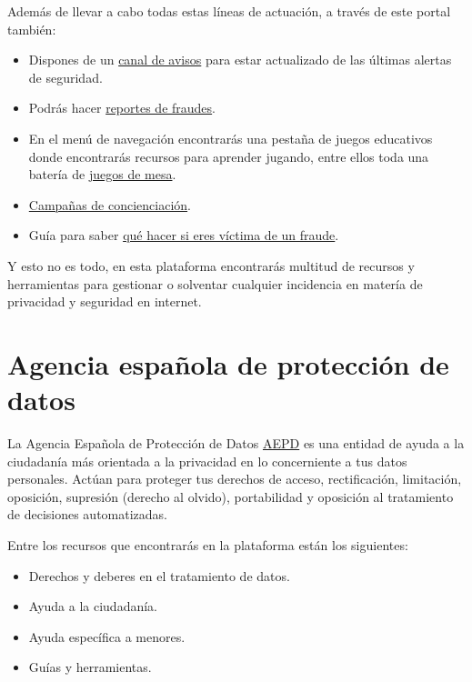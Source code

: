 \documentclass[
  a4paper,
  openany]{book}
\begin{document}
Además de llevar a cabo todas estas líneas de actuación, a través de este portal también:

\begin{itemize}
\item
  Dispones de un \href{https://www.osi.es/es/actualidad/avisos}{canal de avisos} para estar actualizado de las últimas alertas de seguridad.
\item
  Podrás hacer \href{https://www.osi.es/es/reporte-de-fraude}{reportes de fraudes}.
\item
  En el menú de navegación encontrarás una pestaña de juegos educativos donde encontrarás recursos para aprender jugando, entre ellos toda una batería de \href{https://www.osi.es/es/juegos-mesa}{juegos de mesa}.
\item
  \href{https://www.osi.es/es/campanas}{Campañas de concienciación}.
\item
  Guía para saber \href{https://www.osi.es/es/que-hacer-si-eres-victima-de-un-fraude}{qué hacer si eres víctima de un fraude}.
\end{itemize}

Y esto no es todo, en esta plataforma encontrarás multitud de recursos y herramientas para gestionar o solventar cualquier incidencia en matería de privacidad y seguridad en internet.

\hypertarget{agencia-espauxf1ola-de-protecciuxf3n-de-datos}{%
\section{Agencia española de protección de datos}\label{agencia-espauxf1ola-de-protecciuxf3n-de-datos}}

La Agencia Española de Protección de Datos \href{https://www.aepd.es/es}{AEPD} es una entidad de ayuda a la ciudadanía más orientada a la privacidad en lo concerniente a tus datos personales. Actúan para proteger tus derechos de acceso, rectificación, limitación, oposición, supresión (derecho al olvido), portabilidad y oposición al tratamiento de decisiones automatizadas.

Entre los recursos que encontrarás en la plataforma están los siguientes:

\begin{itemize}
\item
  Derechos y deberes en el tratamiento de datos.
\item
  Ayuda a la ciudadanía.
\item
  Ayuda específica a menores.
\item
  Guías y herramientas.
\end{itemize}
\end{document}
